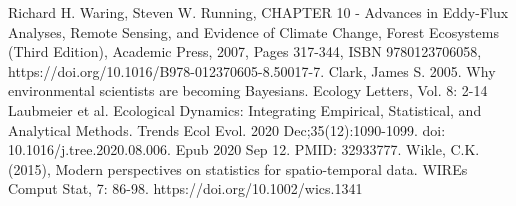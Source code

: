 \documentclass[12pt]{article}
\begin{document}
\begin{thebibliography}{20}
 Richard H. Waring, Steven W. Running, CHAPTER 10 - Advances in Eddy-Flux Analyses, Remote Sensing, and Evidence of Climate Change, Forest Ecosystems (Third Edition), Academic Press, 2007, Pages 317-344, ISBN 9780123706058, https://doi.org/10.1016/B978-012370605-8.50017-7.
 Clark, James S. 2005. Why environmental scientists are becoming Bayesians. Ecology Letters, Vol. 8: 2-14
 Laubmeier et al. Ecological Dynamics: Integrating Empirical, Statistical, and Analytical Methods. Trends Ecol Evol. 2020 Dec;35(12):1090-1099. doi: 10.1016/j.tree.2020.08.006. Epub 2020 Sep 12. PMID: 32933777.
 Wikle, C.K. (2015), Modern perspectives on statistics for spatio-temporal data. WIREs Comput Stat, 7: 86-98. https://doi.org/10.1002/wics.1341

\end{thebibliography}
\end{document}
